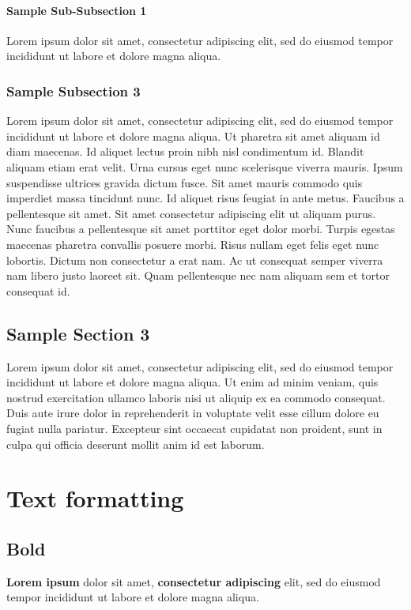 \documentclass[a4paper, 12pt]{report}
\begin{document}
\subsubsection{Sample Sub-Subsection 1}
Lorem ipsum dolor sit amet, consectetur adipiscing elit, sed do eiusmod tempor incididunt ut labore et dolore magna aliqua.

\subsection{Sample Subsection 3}
Lorem ipsum dolor sit amet, consectetur adipiscing elit, sed do eiusmod tempor incididunt ut labore et dolore magna aliqua. Ut pharetra sit amet aliquam id diam maecenas. Id aliquet lectus proin nibh nisl condimentum id. Blandit aliquam etiam erat velit. Urna cursus eget nunc scelerisque viverra mauris. Ipsum suspendisse ultrices gravida dictum fusce. Sit amet mauris commodo quis imperdiet massa tincidunt nunc. Id aliquet risus feugiat in ante metus. Faucibus a pellentesque sit amet. Sit amet consectetur adipiscing elit ut aliquam purus. Nunc faucibus a pellentesque sit amet porttitor eget dolor morbi. Turpis egestas maecenas pharetra convallis posuere morbi. Risus nullam eget felis eget nunc lobortis. Dictum non consectetur a erat nam. Ac ut consequat semper viverra nam libero justo laoreet sit. Quam pellentesque nec nam aliquam sem et tortor consequat id.

\section{Sample Section 3}
Lorem ipsum dolor sit amet, consectetur adipiscing elit, sed do eiusmod tempor incididunt ut labore et dolore magna aliqua. Ut enim ad minim veniam, quis nostrud exercitation ullamco laboris nisi ut aliquip ex ea commodo consequat. Duis aute irure dolor in reprehenderit in voluptate velit esse cillum dolore eu fugiat nulla pariatur. Excepteur sint occaecat cupidatat non proident, sunt in culpa qui officia deserunt mollit anim id est laborum.



\chapter{Text formatting}
\section{Bold}
\textbf{Lorem ipsum} dolor sit amet, \textbf{consectetur adipiscing} elit, sed do eiusmod tempor incididunt ut labore et dolore magna aliqua.
\end{document}
